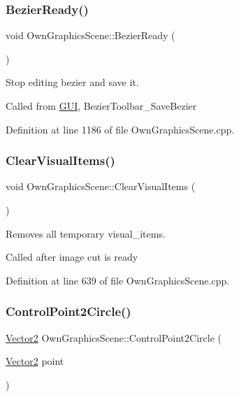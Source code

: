 \subsubsection{\texorpdfstring{Bezier\+Ready()}{BezierReady()}}
{\footnotesize\ttfamily void Own\+Graphics\+Scene\+::\+Bezier\+Ready (\begin{DoxyParamCaption}{ }\end{DoxyParamCaption})}



Stop editing bezier and save it. 

Called from \mbox{\hyperlink{classGUI}{G\+UI}}, Bezier\+Toolbar\+\_\+\+Save\+Bezier 

Definition at line 1186 of file Own\+Graphics\+Scene.\+cpp.

\mbox{\label{classOwnGraphicsScene_a158c6430ca8e07642b693e37ec05119e}} 
\subsubsection{\texorpdfstring{Clear\+Visual\+Items()}{ClearVisualItems()}}
{\footnotesize\ttfamily void Own\+Graphics\+Scene\+::\+Clear\+Visual\+Items (\begin{DoxyParamCaption}{ }\end{DoxyParamCaption})}



Removes all temporary visual\+\_\+items. 

Called after image cut is ready 

Definition at line 639 of file Own\+Graphics\+Scene.\+cpp.

\mbox{\label{classOwnGraphicsScene_abc2de254d3e34b716eb36e33e0486f33}} 
\subsubsection{\texorpdfstring{Control\+Point2\+Circle()}{ControlPoint2Circle()}}
{\footnotesize\ttfamily \mbox{\hyperlink{classVector2}{Vector2}} Own\+Graphics\+Scene\+::\+Control\+Point2\+Circle (\begin{DoxyParamCaption}\item[{\mbox{\hyperlink{classVector2}{Vector2}}}]{point }\end{DoxyParamCaption})}




